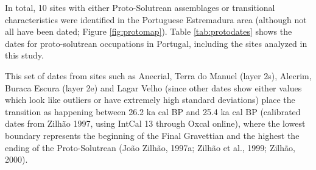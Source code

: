 \documentclass[12pt,twoside]{reedthesis}
\begin{document}
In total, 10 sites with either Proto-Solutrean assemblages or transitional characteristics were identified in the Portuguese Estremadura area (although not all have been dated; Figure \ref{fig:protomap}). Table \ref{tab:protodates} shows the dates for proto-solutrean occupations in Portugal, including the sites analyzed in this study.

This set of dates from sites such as Anecrial, Terra do Manuel (layer 2s), Alecrim, Buraca Escura (layer 2e) and Lagar Velho (since other dates show either values which look like outliers or have extremely high standard deviations) place the transition as happening between 26.2 ka cal BP and 25.4 ka cal BP (calibrated dates from Zilhão 1997, using IntCal 13 through Oxcal online), where the lowest boundary represents the beginning of the Final Gravettian and the highest the ending of the Proto-Solutrean (João Zilhão, 1997a; Zilhão et al., 1999; Zilhão, 2000).
\end{document}
